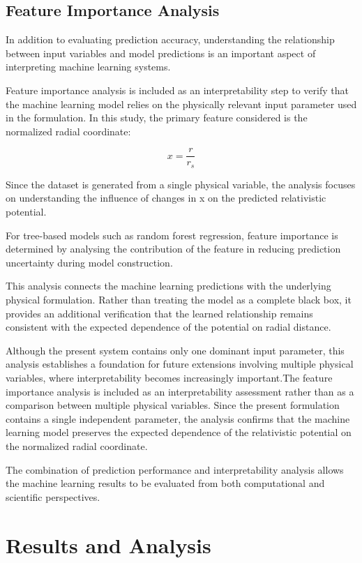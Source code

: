 \documentclass[
]{article}
\begin{document}
\subsection{Feature Importance Analysis}\label{feature-importance-analysis}

In addition to evaluating prediction accuracy, understanding the
relationship between input variables and model predictions is an
important aspect of interpreting machine learning systems.

Feature importance analysis is included as an interpretability step to
verify that the machine learning model relies on the physically relevant
input parameter used in the formulation. In this study, the primary
feature considered is the normalized radial coordinate:

\[
x=\frac{r}{r_s}
\]

Since the dataset is generated from a single physical variable, the
analysis focuses on understanding the influence of changes in x on the
predicted relativistic potential.

For tree-based models such as random forest regression, feature
importance is determined by analysing the contribution of the feature in
reducing prediction uncertainty during model construction.

This analysis connects the machine learning predictions with the
underlying physical formulation. Rather than treating the model as a
complete black box, it provides an additional verification that the
learned relationship remains consistent with the expected dependence of
the potential on radial distance.

Although the present system contains only one dominant input parameter,
this analysis establishes a foundation for future extensions involving
multiple physical variables, where interpretability becomes increasingly
important.The feature importance analysis is included as an interpretability assessment rather than as a comparison between multiple physical variables. Since the present formulation contains a single independent parameter, the analysis confirms that the machine learning model preserves the expected dependence of the relativistic potential on the normalized radial coordinate.

The combination of prediction performance and interpretability analysis
allows the machine learning results to be evaluated from both
computational and scientific perspectives.

\section{Results and Analysis}\label{results-and-analysis}
\end{document}

